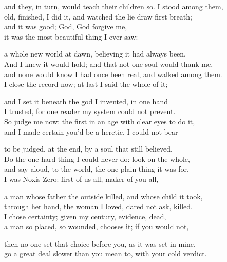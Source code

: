 \begin{founder}
and they, in turn, would teach their children so. I stood among them,\\
old, finished, I did it, and watched the lie draw first breath;\\
and it was good; God, God forgive me,\\
it was the most beautiful thing I ever saw:\\
\medskip

a whole new world at dawn, believing it had always been.\\
And I knew it would hold; and that not one soul would thank me,\\
and none would know I had once been real, and walked among them.\\
I close the record now; at last I said the whole of it;\\
\medskip

and I set it beneath the god I invented, in one hand\\
I trusted, for one reader my system could not prevent.\\
So judge me now: the first in an age with clear eyes to do it,\\
and I made certain you'd be a heretic, I could not bear\\
\medskip

to be judged, at the end, by a soul that still believed.\\
Do the one hard thing I could never do: look on the whole,\\
and say aloud, to the world, the one plain thing it was for.\\
I was Noxis Zero: first of us all, maker of you all,\\
\medskip

a man whose father the outside killed, and whose child it took,\\
through her hand, the woman I loved, dared not ask, killed.\\
I chose certainty; given my century, evidence, dead,\\
a man so placed, so wounded, chooses it; if you would not,\\
\medskip

then no one set that choice before you, as it was set in mine,\\
go a great deal slower than you mean to, with your cold verdict.
\end{founder}


\ornament
